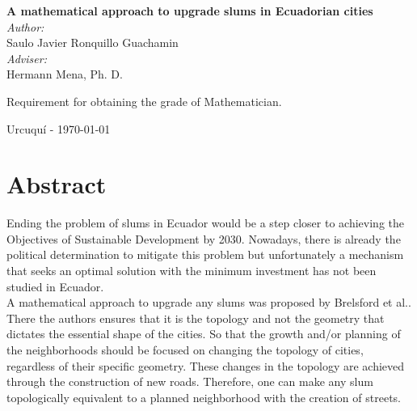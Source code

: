 \documentclass[10pt]{article}
\begin{document}
\begin{center}
  \vspace*{1cm}

  { \huge \bfseries A mathematical approach to upgrade slums in Ecuadorian 
cities}\\[0.4cm]	
  \vspace*{2cm}
  { \large 
    \emph{Author:} \\	
      Saulo Javier Ronquillo Guachamin \\
    \vspace*{1cm}
    \emph{Adviser:} \\
      Hermann Mena, Ph. D.	\\
  }

  \vspace{2cm}
    Requirement for obtaining the grade of Mathematician.	\\	

  \vspace{2cm} 	
  \begin{center}
    {Urcuquí - \today}
  \end{center}
  
\end{center}
																		
\newpage																		

\tableofcontents 

\newpage
\section*{Abstract}
Ending the problem of slums in Ecuador would be a step closer to achieving the Objectives of Sustainable Development by 2030. Nowadays, there is already the political determination to mitigate this problem but unfortunately a mechanism that seeks an optimal solution with the minimum investment has not been studied in Ecuador.\\

A mathematical approach to upgrade any slums was proposed by Brelsford et al.\cite{bre}. There the authors ensures that it is the topology and not the geometry that dictates the essential shape of the cities. So that the growth and/or planning of the neighborhoods should be focused on changing the topology of cities, regardless of their specific geometry. These changes in the topology are achieved through the construction of new roads. Therefore, one can make any slum topologically equivalent to a planned neighborhood with the creation of streets.\\
\end{document}
